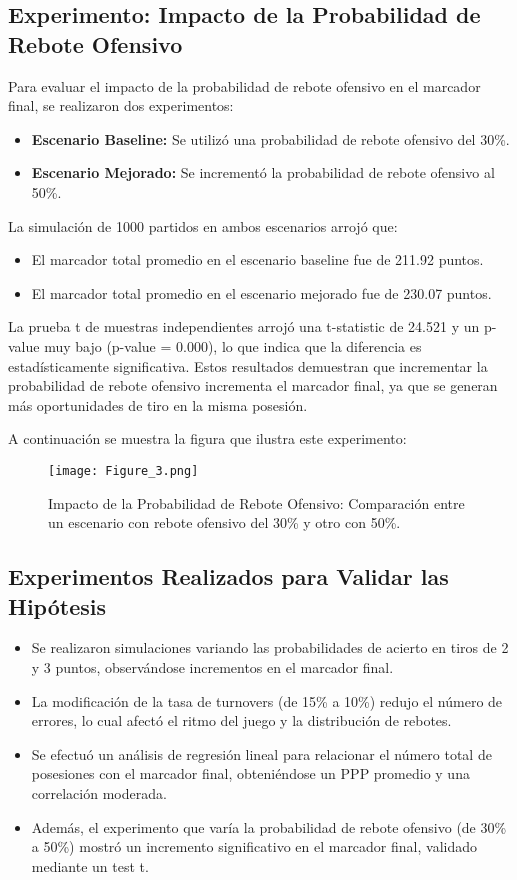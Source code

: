 \documentclass[12pt]{article}
\begin{document}
\subsection{Experimento: Impacto de la Probabilidad de Rebote Ofensivo}
Para evaluar el impacto de la probabilidad de rebote ofensivo en el marcador final, se realizaron dos experimentos:
\begin{itemize}
    \item \textbf{Escenario Baseline:} Se utilizó una probabilidad de rebote ofensivo del 30\%.
    \item \textbf{Escenario Mejorado:} Se incrementó la probabilidad de rebote ofensivo al 50\%.
\end{itemize}
La simulación de 1000 partidos en ambos escenarios arrojó que:
\begin{itemize}
    \item El marcador total promedio en el escenario baseline fue de 211.92 puntos.
    \item El marcador total promedio en el escenario mejorado fue de 230.07 puntos.
\end{itemize}
La prueba t de muestras independientes arrojó una t-statistic de 24.521 y un p-value muy bajo (p-value = 0.000), lo que indica que la diferencia es estadísticamente significativa. Estos resultados demuestran que incrementar la probabilidad de rebote ofensivo incrementa el marcador final, ya que se generan más oportunidades de tiro en la misma posesión.

A continuación se muestra la figura que ilustra este experimento:

\begin{figure}[h]
    \centering
    \texttt{[image: Figure\_3.png]}
    \caption{Impacto de la Probabilidad de Rebote Ofensivo: Comparación entre un escenario con rebote ofensivo del 30\% y otro con 50\%.}
    \label{fig:rebotes}
\end{figure}

\subsection{Experimentos Realizados para Validar las Hipótesis}
\begin{itemize}
    \item Se realizaron simulaciones variando las probabilidades de acierto en tiros de 2 y 3 puntos, observándose incrementos en el marcador final.
    \item La modificación de la tasa de turnovers (de 15\% a 10\%) redujo el número de errores, lo cual afectó el ritmo del juego y la distribución de rebotes.
    \item Se efectuó un análisis de regresión lineal para relacionar el número total de posesiones con el marcador final, obteniéndose un PPP promedio y una correlación moderada.
    \item Además, el experimento que varía la probabilidad de rebote ofensivo (de 30\% a 50\%) mostró un incremento significativo en el marcador final, validado mediante un test t.
\end{itemize}
\end{document}
